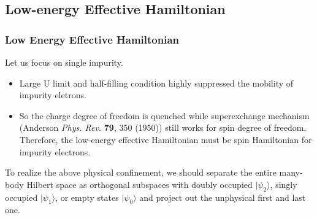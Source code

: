 \documentclass[10pt,aspectratio=43,xcolor=x11names,t]{beamer}%
\begin{document}
	\subsection{Low-energy Effective Hamiltonian}		
		\begin{frame}\frametitle{Low Energy Effective Hamiltonian}
			Let us focus on single impurity.
			\begin{itemize}
				\item Large U limit and half-filling condition highly suppressed the mobility of impurity eletrons.
				\item So the charge degree of freedom is quenched while {\color{blue}superexchange mechanism} (Anderson \textit{Phys. Rev.} \textbf{79}, 350 (1950)) still works for spin degree of freedom. Therefore, the low-energy effective Hamiltonian must be spin Hamiltonian for impurity electrons.  
			\end{itemize}
			\pause
			To realize the above physical confinement, we should separate the entire many-body Hilbert space as orthogonal subspaces with doubly occupied $|\psi_2\rangle$, singly occupied $|\psi_1\rangle$, or empty states $|\psi_0\rangle$ and {\color{blue}project out the unphysical first and last one}.
		\end{frame}
\end{document}
